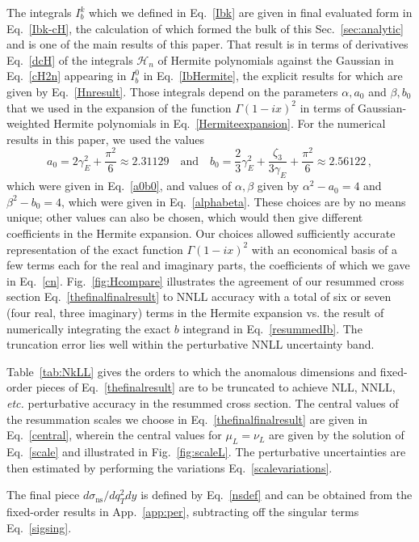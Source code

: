 \documentclass[a4,letterpaper,11pt]{article}
\newcommand{\be}{\begin{equation}}
\newcommand{\ee}{\end{equation}}
\newcommand{\cH}{\mathcal{H}}
\newcommand{\eq}[1]{Eq.~\eqref{#1}}
\renewcommand{\sec}[1]{Sec.~\ref{sec:#1}}
\newcommand{\appx}[1]{App.~\ref{app:#1}}
\newcommand{\fig}[1]{Fig.~\ref{fig:#1}}
\newcommand{\tab}[1]{Table~\ref{tab:#1}}
\begin{document}
The integrals $I_b^k$ which we defined in \eq{Ibk} are given in final evaluated form in \eq{Ibk-cH}, the calculation of which formed the bulk of this \sec{analytic} and is one of the main results of this paper. That result is in terms of derivatives \eq{dcH} of the integrals $\cH_n$ of Hermite polynomials against the Gaussian in \eq{cH2n} appearing in $I_b^0$ in \eq{IbHermite}, the explicit results for which are given by \eq{Hnresult}. Those integrals depend on the parameters $\alpha,a_0$ and $\beta,b_0$ that we used in the expansion of the function $\Gamma(1-ix)^2$ in terms of Gaussian-weighted Hermite polynomials in \eq{Hermiteexpansion}. For the numerical results in this paper, we used the values
\be
a_0 =2\gamma_E^2+\frac{\pi^2}{6}\approx 2.31129\quad 
\text{and}\quad b_0=\frac{2}{3}\gamma_E^2+\frac{\zeta_3}{3\gamma_E} +\frac{\pi^2}{6}\approx 2.56122
\,, \ee
which were given in \eq{a0b0}, and values of $\alpha,\beta$ given by $\alpha^2-a_0=4$ and $\beta^2-b_0=4$, which were given in \eq{alphabeta}. These choices are by no means unique; other values can also be chosen, which would then give different coefficients in the Hermite expansion. Our choices allowed sufficiently accurate representation of the exact function $\Gamma(1-ix)^2$ with an economical basis of a few terms each for the real and imaginary parts, the coefficients of which we gave in \eq{cn}. \fig{Hcompare} illustrates the agreement of our resummed cross section \eq{thefinalfinalresult} to NNLL accuracy with a total of six or seven (four real, three imaginary) terms in the Hermite expansion vs. the result of numerically integrating the exact $b$ integrand in \eq{resummedIb}. The truncation error lies well within the perturbative NNLL uncertainty band.

\tab{NkLL} gives the orders to which the anomalous dimensions and fixed-order pieces of \eq{thefinalresult} are to be truncated to achieve NLL, NNLL, \emph{etc.} perturbative accuracy in the resummed cross section. The central values of the resummation scales we choose in \eq{thefinalfinalresult} are given in \eq{central}, wherein the central values for $\mu_L=\nu_L$ are given by the solution of \eq{scale} and illustrated in \fig{scaleL}. The perturbative uncertainties are then estimated by performing the variations \eq{scalevariations}.

The final piece $d\sigma_{\text{ns}}/dq_T^2 dy$ is defined by \eq{nsdef} and can be obtained from the fixed-order results in \appx{per}, subtracting off the singular terms \eq{sigsing}.
\end{document}

